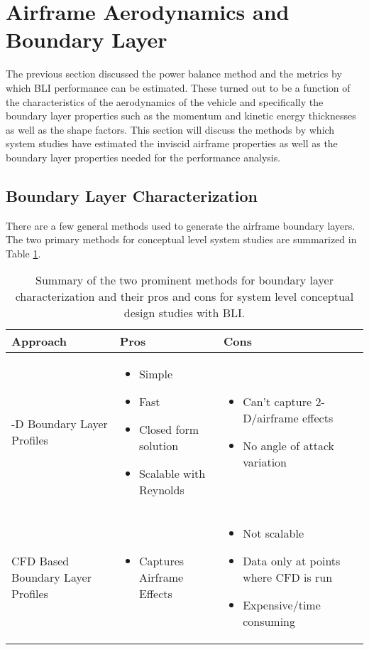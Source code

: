 	\section{Airframe Aerodynamics and Boundary Layer}
		The previous section discussed the power balance method and the metrics by which BLI performance can be estimated.  These turned out to be a function of the characteristics of the aerodynamics of the vehicle and specifically the boundary layer properties such as the momentum and kinetic energy thicknesses as well as the shape factors.  This section will discuss the methods by which system studies have estimated the inviscid airframe properties as well as the boundary layer properties needed for the performance analysis.

		\subsection{Boundary Layer Characterization}
			\indent There are a few general methods used to generate the airframe boundary layers.  The two primary methods for conceptual level system studies are summarized in Table \ref{Methods_Airframe}.  
			\begin{table}[htp]
				\centering
				\begin{tabular}{| >{\centering}m{4.5cm} | >{\centering}m{4.5cm} | m{4.5cm} |} 
					\hline
					Approach & Pros & Cons 
					\\
					\hline 
						1-D Boundary Layer Profiles 
					&   
						\begin{itemize}
							\item{Simple}
							\item{Fast}
							\item{Closed form solution}
							\item{Scalable with Reynolds}
						\end{itemize} 
					& 
						\begin{itemize}
							\item{Can't capture 2-D/airframe effects}
							\item{No angle of attack variation}
						\end{itemize} 
					\\
					\hline
						CFD Based Boundary Layer Profiles 
					& 
						\begin{itemize}
							\item{Captures Airframe Effects}
						\end{itemize} 
					&
						\begin{itemize}
							\item{Not scalable}
							\item{Data only at points where CFD is run}	
							\item{Expensive/time consuming}																							
						\end{itemize} 	
					\\																			
					\hline
				\end{tabular}
				\caption{Summary of the two prominent methods for boundary layer characterization and their pros and cons for system level conceptual design studies with BLI.}
				\label{Methods_Airframe}
			\end{table}  		
